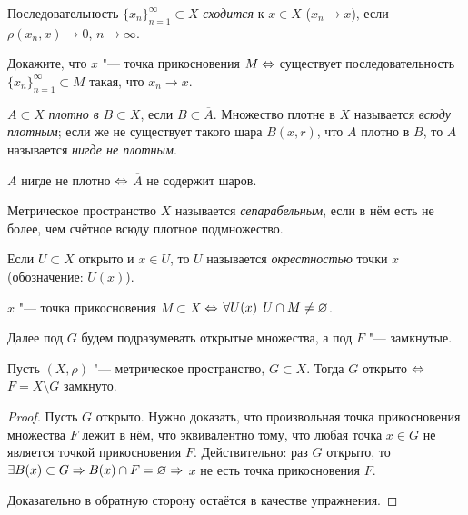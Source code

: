 \documentclass[main]{subfiles}
\begin{document}
\begin{definition}
  Последовательность \( \{ x_n \}_{n=1}^\infty \subset X \)
  \emph{сходится} к \( x \in X \) (\( x_n \to x \)),
  если \( \rho(x_n, x) \to 0 \), \( n \to \infty \).
\end{definition}

\begin{exercise}
  Докажите, что \( x \) "--- точка прикосновения \( M \Leftrightarrow \)
  существует последовательность \( \{ x_n \}_{n=1}^\infty \subset M \)
  такая, что \( x_n \to x \).
\end{exercise}

\begin{definition}
  \( A \subset X \) \emph{плотно в} \( B \subset X \),
  если \( B \subset \overline{A} \).
  Множество плотне в \( X \) называется \emph{всюду плотным};
  если же не существует такого шара \( B(x, r) \),
  что \( A \) плотно в \( B \),
  то \( A \) называется \emph{нигде не плотным}.
\end{definition}

\begin{proposition}
  \( A \) нигде не плотно \( \Leftrightarrow \) \( \overline{A} \) не содержит шаров.
\end{proposition}

\begin{definition}
  Метрическое пространство \( X \) называется \emph{сепарабельным},
  если в нём есть не более, чем счётное всюду плотное подмножество.
\end{definition}

\begin{definition}
  Если \( U \subset X \) открыто и \( x \in U \), то
  \( U \) называется \emph{окрестностью} точки \( x \)
  (обозначение: \( U(x) \)).
\end{definition}

\begin{proposition}
  \( x \) "--- точка прикосновения \( M \subset X \)
  \( \Leftrightarrow \) \( \forall {U(x)} \; \, U \cap M \ne \varnothing \).
\end{proposition}

Далее под \( G \) будем подразумевать открытые множества,
а под \( F \) "--- замкнутые.

\begin{theorem}
  Пусть \( (X, \rho) \) "--- метрическое пространство,
  \( G \subset X \). Тогда \( G \) открыто \( \Leftrightarrow \)
  \( F = X \setminus G \) замкнуто.
\end{theorem}
\begin{proof}
  Пусть \( G \) открыто. Нужно доказать, что
  произвольная точка прикосновения множества \( F \)
  лежит в нём, что эквивалентно тому, что любая точка
  \( x \in G \) не является точкой прикосновения \( F \).
  Действительно: раз \( G \) открыто, то
  \( \exists B(x) \subset G \Rightarrow B(x) \cap F = \varnothing \Rightarrow \)
  \( x \) не есть точка прикосновения \( F \).

  Доказательно в обратную сторону остаётся в качестве упражнения.
\end{proof}
\end{document}
